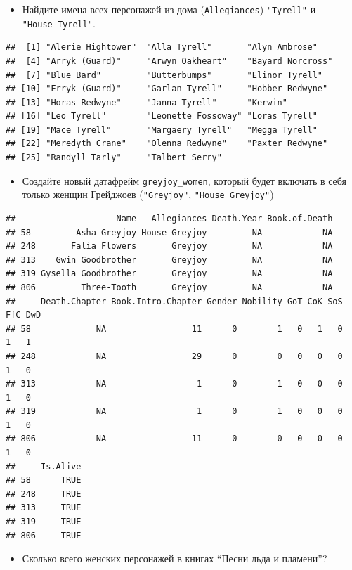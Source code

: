\documentclass[]{book}
\providecommand{\tightlist}{%
  \setlength{\itemsep}{0pt}\setlength{\parskip}{0pt}}
\begin{document}
\begin{itemize}
\tightlist
\item
  Найдите имена всех персонажей из дома (\texttt{Allegiances}) \texttt{"Tyrell"} и \texttt{"House\ Tyrell"}.
\end{itemize}

\begin{verbatim}
##  [1] "Alerie Hightower"  "Alla Tyrell"       "Alyn Ambrose"     
##  [4] "Arryk (Guard)"     "Arwyn Oakheart"    "Bayard Norcross"  
##  [7] "Blue Bard"         "Butterbumps"       "Elinor Tyrell"    
## [10] "Erryk (Guard)"     "Garlan Tyrell"     "Hobber Redwyne"   
## [13] "Horas Redwyne"     "Janna Tyrell"      "Kerwin"           
## [16] "Leo Tyrell"        "Leonette Fossoway" "Loras Tyrell"     
## [19] "Mace Tyrell"       "Margaery Tyrell"   "Megga Tyrell"     
## [22] "Meredyth Crane"    "Olenna Redwyne"    "Paxter Redwyne"   
## [25] "Randyll Tarly"     "Talbert Serry"
\end{verbatim}

\begin{itemize}
\tightlist
\item
  Создайте новый датафрейм \texttt{greyjoy\_women}, который будет включать в себя только женщин Грейджоев (\texttt{"Greyjoy"}, \texttt{"House\ Greyjoy"})
\end{itemize}

\begin{verbatim}
##                    Name   Allegiances Death.Year Book.of.Death
## 58         Asha Greyjoy House Greyjoy         NA            NA
## 248       Falia Flowers       Greyjoy         NA            NA
## 313    Gwin Goodbrother       Greyjoy         NA            NA
## 319 Gysella Goodbrother       Greyjoy         NA            NA
## 806         Three-Tooth       Greyjoy         NA            NA
##     Death.Chapter Book.Intro.Chapter Gender Nobility GoT CoK SoS FfC DwD
## 58             NA                 11      0        1   0   1   0   1   1
## 248            NA                 29      0        0   0   0   0   1   0
## 313            NA                  1      0        1   0   0   0   1   0
## 319            NA                  1      0        1   0   0   0   1   0
## 806            NA                 11      0        0   0   0   0   1   0
##     Is.Alive
## 58      TRUE
## 248     TRUE
## 313     TRUE
## 319     TRUE
## 806     TRUE
\end{verbatim}

\begin{itemize}
\tightlist
\item
  Сколько всего женских персонажей в книгах ``Песни льда и пламени''?
\end{itemize}
\end{document}
